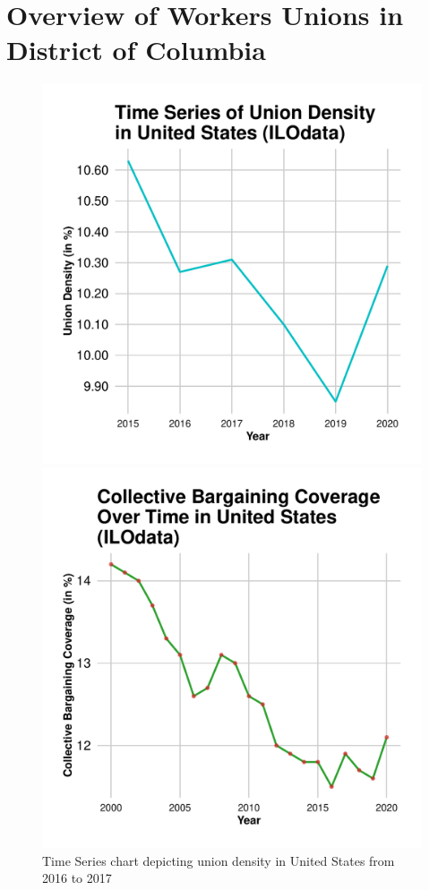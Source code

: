 \documentclass[11pt]{article}\usepackage[]{graphicx}\usepackage[]{xcolor}
\newenvironment{knitrout}{}{} %
\begin{document}
\section{Overview of Workers Unions in District of Columbia}
\begin{figure}[h!]
  \centering

  \begin{minipage}{0.48\linewidth}
\begin{knitrout}
\color{fgcolor}

{\centering \includegraphics[width=0.7\linewidth]{figure/United_Statestradeuniondensity-1} 

}


\end{knitrout}
    \caption{Time Series chart depicting union density in United States from 2016 to 2017}
  \end{minipage}
  \hfill
  \begin{minipage}{0.48\linewidth}
\begin{knitrout}
\color{fgcolor}

{\centering \includegraphics[width=0.7\linewidth]{figure/United_StatesCollectiveBargaining-1} 

}
\end{knitrout}
\end{minipage}
\end{figure}
\end{document}
